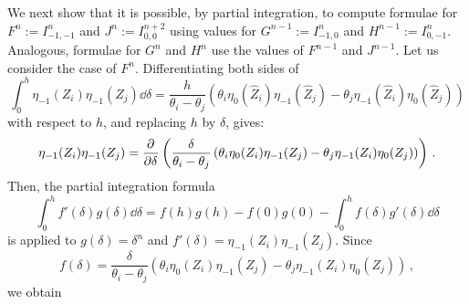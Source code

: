 We next show that it is possible, by partial integration, to compute formulae for $F^{n}:=I_{-1,-1}^{n}$ and $J^{n}:=I_{0,0}^{n+2}$ using values for $G^{n-1}:=I_{-1,0}^{n}$ and $H^{n-1}:=I_{0,-1}^{n}$. Analogous, formulae for $G^{n}$ and $H^{n}$ use the values of $F^{n-1}$ and $J^{n-1}$. Let us consider the case of $F^{n}$. Differentiating both sides of
$$
  \int^{h}_0 \eta_{-1}(Z_i)\eta_{-1}(Z_j)\dd \delta = \frac{h}{\theta_i - \theta_j}\left(\theta_i \eta_0(\hat{Z}_i)\eta_{-1}(\hat{Z}_j) - \theta_j \eta_{-1}(\hat{Z}_i)\eta_0(\hat{Z}_j)\right)
$$
with respect to $h$, and replacing $h$ by $\delta$, gives:
$$
  \eta_{-1}(Z_i)\eta_{-1}(Z_j) = \pdv[]{}{\delta}\left(\frac{\delta}{\theta_i - \theta_j}\left(\theta_i \eta_0(Z_i)\eta_{-1}(Z_j) - \theta_j \eta_{-1}(Z_i)\eta_0(Z_j)\right)\right) \,.
$$
Then, the partial integration formula
$$
  \int_{0}^h f'(\delta)g(\delta) \dd \delta = f(h)g(h) - f(0)g(0) - \int_0^{h} f(\delta) g'(\delta) \dd \delta
$$
is applied to $g(\delta) = \delta^{n}$ and $f'(\delta) = \eta_{-1}(Z_i)\eta_{-1}(Z_j)$. Since
$$
  f(\delta) = \frac{\delta}{\theta_i - \theta_j}\left(\theta_i \eta_0(Z_i)\eta_{-1}(Z_j) - \theta_j \eta_{-1}(Z_i)\eta_0(Z_j)\right)\,,
$$
we obtain
